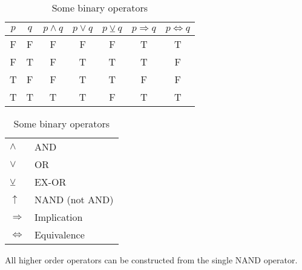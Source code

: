 \documentclass[root.tex]{subfiles}
\begin{document}
    \begin{table}[h]
      \centering
      \begin{tabular}{c|c||c|c|c|c|c}
        $p$ & $q$ & $p\land q$ & $p\lor q$ & $p\veebar q$ & $p \Rightarrow q$ & $p \Leftrightarrow q$ \\
        \hline
          \rule{0pt}{12pt} F & F & F & F & F & T & T\\
                           F & T & F & T & T & T & F\\
                           T & F & F & T & T & F & F\\
                           T & T & T & T & F & T & T
      \end{tabular}\quad
      \begin{tabular}{ll}
        $\land$           & AND\\
        $\lor$            & OR\\
        $\veebar$         & EX-OR\\
        $\uparrow$        & NAND (not AND)\\
        $\Rightarrow$     & Implication\\
        $\Leftrightarrow$ & Equivalence
      \end{tabular}
      \caption{Some binary operators}
    \end{table}

\begin{remark}
  All higher order operators can be constructed from the single NAND operator.
\end{remark}
\end{document}
